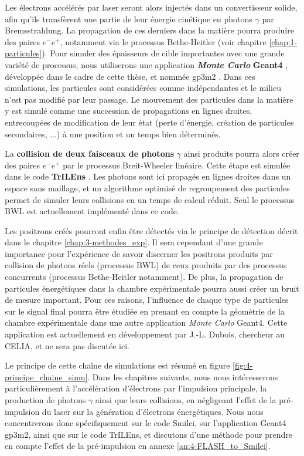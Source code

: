 \begin{refsection}
Les électrons accélérés par laser seront alors injectés dans un convertisseur solide, afin qu'ils transfèrent une partie de leur énergie cinétique en photons $\gamma$ par Bremsstrahlung. La propagation de ces derniers dans la matière pourra produire des paires $e^-e^+$, notamment via le processus Bethe-Heitler (voir chapitre \ref{chap:1-particules}). Pour simuler des épaisseurs de cible importantes avec une grande variété de processus, nous utiliserons une application \textbf{\textit{Monte Carlo}} \textbf{Geant4} \parencite{agostinelli_2003}, développée dans le cadre de cette thèse, et nommée gp3m2 \parencite{gp3m2}. 
Dans ces simulations, les particules sont considérées comme indépendantes et le milieu n'est pas modifié par leur passage. Le mouvement des particules dans la matière y est simulé comme une succession de propagations en lignes droites, entrecoupées de modification de leur état (perte d'énergie, création de particules secondaires, ...) à une position et un temps bien déterminés. 

La \textbf{collision de deux faisceaux de photons} $\gamma$ ainsi produits pourra alors créer des paires $e^-e^+$ par le processus Breit-Wheeler linéaire. Cette étape est simulée dans le code \textbf{TrILEns} \parencite{jansen_2018}.
Les photons sont ici propagés en lignes droites dans un espace sans maillage, et un algorithme optimisé de regroupement des particules permet de simuler leurs collisions en un temps de calcul réduit. Seul le processus BWL est actuellement implémenté dans ce code.

Les positrons créés pourront enfin être détectés via le principe de détection décrit dans le chapitre \ref{chap:3-methodes_exp}. Il sera cependant d'une grande importance pour l'expérience de savoir discerner les positrons produits par collision de photons réels (processus BWL) de ceux produits par des processus concurrents (processus Bethe-Heitler notamment). De plus, la propagation de particules énergétiques dans la chambre expérimentale pourra aussi créer un bruit de mesure important. Pour ces raisons, l'influence de chaque type de particules sur le signal final pourra être étudiée en prenant en compte la géométrie de la chambre expérimentale dans une autre application \textit{Monte Carlo} Geant4. 
Cette application est actuellement en développement par J.-L. Dubois, chercheur au CELIA, et ne sera pas discutée ici. 

Le principe de cette chaîne de simulations est résumé en figure \ref{fig:4-principe_chaine_simu}. Dans les chapitres suivants, nous nous intéresserons particulièrement à l'accélération d'électrons par l'impulsion principale, la production de photons $\gamma$ ainsi que leurs collisions, en négligeant l'effet de la pré-impulsion du laser sur la génération d'électrons énergétiques. Nous nous concentrerons donc spécifiquement sur le code Smilei, sur l'application Geant4 gp3m2, ainsi que sur le code TrILEns, et discutons d'une méthode pour prendre en compte l'effet de la pré-impulsion en annexe \ref{an:4-FLASH_to_Smilei}.


\end{refsection}
